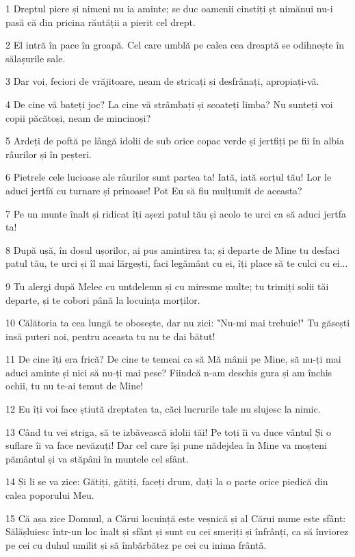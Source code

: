 \par 1 Dreptul piere și nimeni nu ia aminte; se duc oamenii cinstiți șt nimănui nu-i pasă că din pricina răutății a pierit cel drept.
\par 2 El intră în pace în groapă. Cel care umblă pe calea cea dreaptă se odihnește în sălașurile sale.
\par 3 Dar voi, feciori de vrăjitoare, neam de stricați și desfrânați, apropiați-vă.
\par 4 De cine vă bateți joc? La cine vă strâmbați și scoateți limba? Nu sunteți voi copii păcătoși, neam de mincinoși?
\par 5 Ardeți de poftă pe lângă idolii de sub orice copac verde și jertfiți pe fii în albia râurilor și în peșteri.
\par 6 Pietrele cele lucioase ale râurilor sunt partea ta! Iată, iată sorțul tău! Lor le aduci jertfă cu turnare și prinoase! Pot Eu să fiu mulțumit de aceasta?
\par 7 Pe un munte înalt și ridicat îți așezi patul tău și acolo te urci ca să aduci jertfa ta!
\par 8 După ușă, în dosul ușorilor, ai pus amintirea ta; și departe de Mine tu desfaci patul tău, te urci și îl mai lărgești, faci legământ cu ei, îți place să te culci cu ei...
\par 9 Tu alergi după Melec cu untdelemn și cu miresme multe; tu trimiți solii tăi departe, și te cobori până la locuința morților.
\par 10 Călătoria ta cea lungă te obosește, dar nu zici: "Nu-mi mai trebuie!" Tu găsești insă puteri noi, pentru aceasta tu nu te dai bătut!
\par 11 De cine îți era frică? De cine te temeai ca să Mă mânii pe Mine, să nu-ți mai aduci aminte și nici să nu-ți mai pese? Fiindcă n-am deschis gura și am închis ochii, tu nu te-ai temut de Mine!
\par 12 Eu îți voi face știută dreptatea ta, căci lucrurile tale nu slujesc la nimic.
\par 13 Când tu vei striga, să te izbăvească idolii tăi! Pe toți îi va duce vântul Și o suflare îi va face nevăzuți! Dar cel care își pune nădejdea în Mine va moșteni pământul și va stăpâni în muntele cel sfânt.
\par 14 Și li se va zice: Gătiți, gătiți, faceți drum, dați la o parte orice piedică din calea poporului Meu.
\par 15 Că așa zice Domnul, a Cărui locuință este veșnică și al Cărui nume este sfânt: Sălășluiesc într-un loc înalt și sfânt și sunt cu cei smeriți și înfrânți, ca să înviorez pe cei cu duhul umilit și să îmbărbătez pe cei cu inima frântă.
